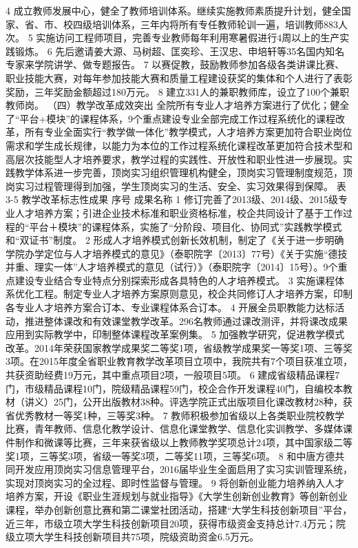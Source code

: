 4
成立教师发展中心，健全了教师培训体系。继续实施教师素质提升计划，健全国家、省、市、校四级培训体系，三年内将所有专任教师轮训一遍，培训教师883人次。
5
实施访问工程师项目，完善专业教师每年利用寒暑假进行4周以上的生产实践锻炼。
6
先后邀请姜大源、马树超、匡奕珍、王汉忠、申培轩等35名国内知名专家来学院讲学、做专题报告。
7
以赛促教，鼓励教师参加各级各类讲课比赛、职业技能大赛，对每年参加技能大赛和质量工程建设获奖的集体和个人进行了表彰奖励，三年奖励金额超过180万元。
8
建立331人的兼职教师库，设立了100个兼职教师岗。
（四）教学改革成效突出
全院所有专业人才培养方案进行了优化；健全了“平台+模块”的课程体系，9个重点建设专业全部完成工作过程系统化的课程改革，所有专业全面实行“教学做一体化”教学模式，人才培养方案更加符合职业岗位需求和学生成长规律，以能力为本位的工作过程系统化课程改革更加符合技术型和高层次技能型人才培养要求，教学过程的实践性、开放性和职业性进一步展现。实践教学体系进一步完善，顶岗实习组织管理机构健全，顶岗实习管理制度规范，顶岗实习过程管理得到加强，学生顶岗实习的生活、安全、实习效果得到保障。
表3-5  教学改革标志性成果
序号
成果名称
1
修订完善了2013级、2014级、2015级专业人才培养方案；引进企业技术标准和职业资格标准，校企共同设计了基于工作过程的“平台＋模块”的课程体系，实施了“分阶段、项目化、协同式”实践教学模式和“双证书”制度。
2
形成人才培养模式创新长效机制，制定了《关于进一步明确学院办学定位与人才培养模式的意见》（泰职院字〔2013〕77号）《关于实施“德技并重、理实一体”人才培养模式的意见（试行）》（泰职院字〔2014〕15号）。9个重点建设专业结合专业特点分别探索形成各具特色的人才培养模式。
3
实施课程体系优化工程。制定专业人才培养方案原则意见，校企共同修订人才培养方案，印制各专业人才培养方案合订本、专业课程体系合订本。
4
开展全员职教能力达标活动，推进整体课改和有效课堂教学改革。296名教师通过课改测评，并将课改成果应用到实际教学中，印制整体课程改革案例集。
5
加强教学研究，促进教学模式改革。2014年荣获国家教学成果奖二等奖1项，省级教学成果奖一等奖1项、三等奖3项。在2015年度全省职业教育教学改革项目立项中，我院共有7个项目获准立项，共获资助经费19万元，其中重点项目2项，一般项目5项。
6
建成省级精品课程7门，市级精品课程10门，院级精品课程59门，校企合作开发课程40门，自编校本教材（讲义）25门，公开出版教材38种。评选学院正式出版项目化课改教材28种，获省优秀教材一等奖1种，三等奖3种。
7
教师积极参加省级以上各类职业院校教学比赛，青年教师、信息化教学设计、信息化课堂教学、信息化实训教学、多媒体课件制作和微课等比赛，三年来获省级以上教师教学奖项总计24项，其中国家级二等奖1项，三等奖3项，省级一等奖3项，二等奖11项，三等奖6项。
8
和中唐方德共同开发应用顶岗实习信息管理平台，2016届毕业生全面启用了实习实训管理系统，实现对顶岗实习的全过程、即时性监督与管理。
9
将创新创业能力培养纳入人才培养方案，开设《职业生涯规划与就业指导》《大学生创新创业教育》等创新创业课程，举办创新创意比赛和第二课堂社团活动，搭建“大学生科技创新项目”平台，近三年，市级立项大学生科技创新项目20项，获得市级资金支持总计7.4万元；院级立项大学生科技创新项目共75项，院级资助资金6.5万元。
